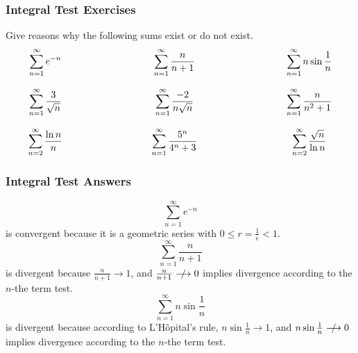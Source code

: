 \documentclass[xcolor=dvipsnames]{beamer}
\def\qeq{\mathrel{%
    \mathchoice{\QEQ}{\QEQ}{\scriptsize\QEQ}{\tiny\QEQ}%
}}
\def\QEQ{{%
    \setbox0\hbox{$\longrightarrow$}%
    \rlap{\hbox to \wd0{\hss/\hss}}\box0
  }}
\begin{document}
\begin{frame}
  \frametitle{Integral Test Exercises}
  Give reasons why the following sums exist or do not exist.
  \begin{equation}
    \label{eq:oosuphif}
    \begin{array}{ccccc}
      \displaystyle \sum_{n=1}^{\infty}e^{-n} & \hspace{1in} & \displaystyle \sum_{n=1}^{\infty}\frac{n}{n+1} & \hspace{1in} & \displaystyle \sum_{n=1}^{\infty}n\sin\frac{1}{n} \\
      & \hspace{1in} & \\
      \displaystyle \sum_{n=1}^{\infty}\frac{3}{\sqrt{n}} & \hspace{1in} & \displaystyle \sum_{n=1}^{\infty}\frac{-2}{n\sqrt{n}} & & \displaystyle \sum_{n=1}^{\infty}\frac{n}{n^{2}+1} \\
      & \hspace{1in} & \\
      \displaystyle \sum_{n=2}^{\infty}\frac{\ln{}n}{n} & \hspace{1in} & \displaystyle \sum_{n=1}^{\infty}\frac{5^{n}}{4^{n}+3} & & \displaystyle \sum_{n=2}^{\infty}\frac{\sqrt{n}}{\ln{}n}\\
    \end{array}\notag
  \end{equation}
\end{frame}

\begin{frame}
  \frametitle{Integral Test Answers}
  \begin{equation}
    \label{eq:epeiveix}
    \sum_{n=1}^{\infty}e^{-n}
  \end{equation}
is convergent because it is a geometric series with
$0\leq{}r=\frac{1}{e}<1$.
\begin{equation}
  \label{eq:bauveeze}
\sum_{n=1}^{\infty}\frac{n}{n+1}  
\end{equation}
is divergent because $\frac{n}{n+1}\longrightarrow{}1$, and
$\frac{n}{n+1}\qeq{}0$ implies divergence
according to the $n$-the term test.
\begin{equation}
  \label{eq:uithaezi}
\sum_{n=1}^{\infty}n\sin\frac{1}{n}  
\end{equation}
is divergent because according to L'H{\^o}pital's rule,
$n\sin\frac{1}{n}\longrightarrow{}1$, and $n\sin\frac{1}{n}\qeq{}0$ implies divergence
according to the $n$-the term test.
\end{frame}
\end{document}

